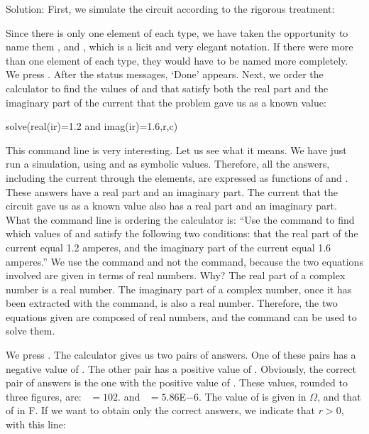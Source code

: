 Solution: First, we simulate the circuit according to the rigorous
treatment:


Since there is only one element of each type, we have taken the
opportunity to name them ,  and , which is a
licit and very elegant notation. If there were more than one element
of each type, they would have to be named more completely. We press
. After the status messages, `Done' appears. Next, we
order the calculator to find the values of  and 
that satisfy both the real part and the imaginary part of the
current that the problem gave us as a known value:

\begin{entry}
solve(real(ir)=1.2 and imag(ir)=1.6,{r,c})
\end{entry}

This command line is very interesting. Let us see what it means. We
have just run a simulation, using  and  as symbolic
values. Therefore, all the answers, including the current through
the elements, are expressed as functions of  and .
These answers have a real part and an imaginary part. The current
that the circuit gave us as a known value also has a real part and
an imaginary part. What the command line is ordering the calculator
is: ``Use the  command to find which values of 
and  satisfy the following two conditions: that the real
part of the current equal 1.2 amperes, and the imaginary part of the
current equal 1.6 amperes.'' We use the  command and not
the  command, because the two equations involved are
given in terms of real numbers. Why? The real part of a complex
number is a real number. The imaginary part of a complex number,
once it has been extracted with the  command, is also a
real number. Therefore, the two equations given are composed of real
numbers, and the  command can be used to solve them.

We press . The calculator gives us two pairs of answers.
One of these pairs has a negative value of . The other pair
has a positive value of . Obviously, the correct pair of
answers is the one with the positive value of . These
values, rounded to three figures, are: ~$= 102.$ and
~$= 5.86$E$-6$. The value of  is given in $\Omega$,
and that of  in F. If we want to obtain only the correct
answers, we indicate that $r > 0$, with this line:

